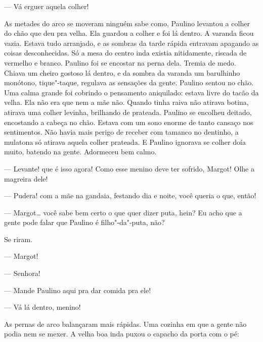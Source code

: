 
--- Vá erguer aquela colher!

As metades do arco se moveram ninguém sabe como, Paulino levantou a
colher do chão que deu pra velha. Ela guardou a colher e foi lá dentro.
A varanda ficou vazia. Estava tudo arranjado, e as sombras da tarde
rápida entravam apagando as coisas desconhecidas. Só a mesa do centro
inda existia nitidamente, riscada de vermelho e branco. Paulino foi se
encostar na perna dela. Tremia de medo. Chiava um cheiro gostoso lá
dentro, e da sombra da varanda um barulhinho monótono, tique"-taque,
regulava as sensações da gente. Paulino sentou no chão. Uma calma grande
foi cobrindo o pensamento aniquilado: estava livre do tacão da velha.
Ela não era que nem a mãe não. Quando tinha raiva não atirava botina,
atirava uma colher levinha, brilhando de prateada. Paulino se encolheu
deitado, encostando a cabeça no chão. Estava com um sono enorme de tanto
cansaço nos sentimentos. Não havia mais perigo de receber com tamanco no
dentinho, a mulatona só atirava aquela colher prateada. E Paulino
ignorava se colher doía muito, batendo na gente. Adormeceu bem calmo.

--- Levante! que é isso agora! Como esse menino deve ter sofrido,
Margot! Olhe a magreira dele!

--- Pudera! com a mãe na gandaia, festando dia e noite, você queria o
que, então!

--- Margot\ldots{} você sabe bem certo o que quer dizer puta, hein? Eu acho
que a gente pode falar que Paulino é filho"-da"-puta, não?

Se riram.

--- Margot!

--- Senhora!

--- Mande Paulino aqui pra dar comida pra ele!

--- Vá lá dentro, menino!

As pernas de arco balançaram mais rápidas. Uma cozinha em que a gente
não podia nem se mexer. A velha boa inda puxou o capacho da porta com o
pé:

